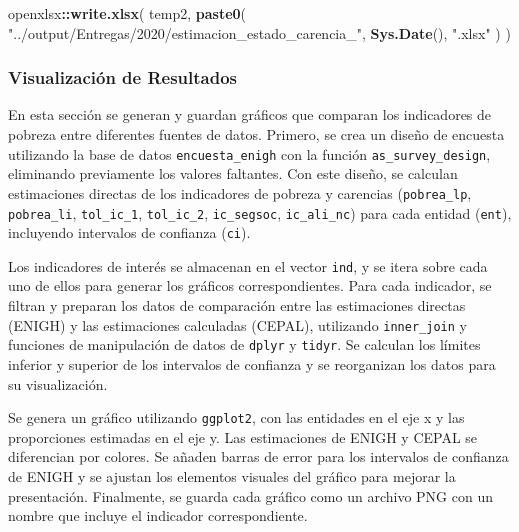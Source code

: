 \documentclass[
  12pt,
]{book}
\newenvironment{Shaded}{\begin{snugshade}}{\end{snugshade}}
\newcommand{\FunctionTok}[1]{\textcolor[rgb]{0.13,0.29,0.53}{\textbf{#1}}}
\newcommand{\NormalTok}[1]{#1}
\newcommand{\SpecialCharTok}[1]{\textcolor[rgb]{0.81,0.36,0.00}{\textbf{#1}}}
\newcommand{\StringTok}[1]{\textcolor[rgb]{0.31,0.60,0.02}{#1}}
\begin{document}
\begin{Shaded}
\begin{Highlighting}[]
\NormalTok{openxlsx}\SpecialCharTok{::}\FunctionTok{write.xlsx}\NormalTok{(}
\NormalTok{  temp2,}
  \FunctionTok{paste0}\NormalTok{(}
    \StringTok{"../output/Entregas/2020/estimacion\_estado\_carencia\_"}\NormalTok{,}
    \FunctionTok{Sys.Date}\NormalTok{(),}
    \StringTok{".xlsx"}
\NormalTok{  )}
\NormalTok{)}
\end{Highlighting}
\end{Shaded}

\hypertarget{visualizaciuxf3n-de-resultados}{%
\subsubsection*{Visualización de Resultados}\label{visualizaciuxf3n-de-resultados}}

En esta sección se generan y guardan gráficos que comparan los indicadores de pobreza entre diferentes fuentes de datos. Primero, se crea un diseño de encuesta utilizando la base de datos \texttt{encuesta\_enigh} con la función \texttt{as\_survey\_design}, eliminando previamente los valores faltantes. Con este diseño, se calculan estimaciones directas de los indicadores de pobreza y carencias (\texttt{pobrea\_lp}, \texttt{pobrea\_li}, \texttt{tol\_ic\_1}, \texttt{tol\_ic\_2}, \texttt{ic\_segsoc}, \texttt{ic\_ali\_nc}) para cada entidad (\texttt{ent}), incluyendo intervalos de confianza (\texttt{ci}).

Los indicadores de interés se almacenan en el vector \texttt{ind}, y se itera sobre cada uno de ellos para generar los gráficos correspondientes. Para cada indicador, se filtran y preparan los datos de comparación entre las estimaciones directas (ENIGH) y las estimaciones calculadas (CEPAL), utilizando \texttt{inner\_join} y funciones de manipulación de datos de \texttt{dplyr} y \texttt{tidyr}. Se calculan los límites inferior y superior de los intervalos de confianza y se reorganizan los datos para su visualización.

Se genera un gráfico utilizando \texttt{ggplot2}, con las entidades en el eje x y las proporciones estimadas en el eje y. Las estimaciones de ENIGH y CEPAL se diferencian por colores. Se añaden barras de error para los intervalos de confianza de ENIGH y se ajustan los elementos visuales del gráfico para mejorar la presentación. Finalmente, se guarda cada gráfico como un archivo PNG con un nombre que incluye el indicador correspondiente.
\end{document}
